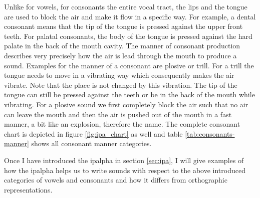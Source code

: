 Unlike for vowels, for consonants the entire vocal tract, the lips and the tongue are used to block the air and make it flow in a specific way. For example, a dental consonant means that the tip of the tongue is pressed against the upper front teeth. For palatal consonants, the body of the tongue is pressed against the hard palate in the back of the mouth cavity.  
The manner of consonant production describes very precisely how the air is lead through the mouth to produce a sound. Examples for the manner of a consonant are plosive or trill. For a trill the tongue needs to move in a vibrating way which consequently makes the air vibrate. Note that the place is not changed by this vibration. The tip of the tongue can still be pressed against the teeth or be in the back of the mouth while vibrating. For a plosive sound we first completely block the air such that no air can leave the mouth and then the air is pushed out of the mouth in a fast manner, a bit like an explosion, therefore the name. The complete consonant chart is depicted in figure \ref{fig:ipa_chart} as well and table \ref{tab:consonants-manner} shows all consonant manner categories. 


Once I have introduced the \ac{ipalpha} in section \ref{sec:ipa}, I will give examples of how the \ac{ipalpha} helps us to write sounds with respect to the above introduced categories of vowels and consonants and how it differs from orthographic representations. 

